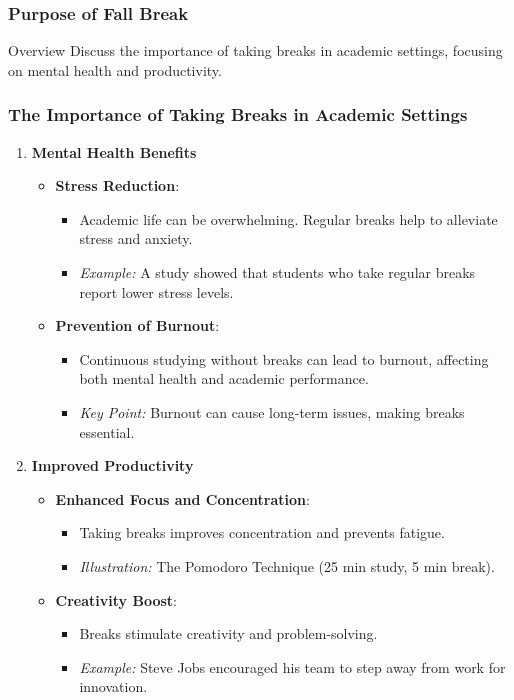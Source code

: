\documentclass[aspectratio=169]{beamer}
\begin{document}
\begin{frame}[fragile]
    \frametitle{Purpose of Fall Break}
    \begin{block}{Overview}
        Discuss the importance of taking breaks in academic settings, focusing on mental health and productivity.
    \end{block}
\end{frame}

\begin{frame}[fragile]
    \frametitle{The Importance of Taking Breaks in Academic Settings}
    \begin{enumerate}
        \item \textbf{Mental Health Benefits}
        \begin{itemize}
            \item \textbf{Stress Reduction}:
            \begin{itemize}
                \item Academic life can be overwhelming. Regular breaks help to alleviate stress and anxiety.
                \item \textit{Example:} A study showed that students who take regular breaks report lower stress levels.
            \end{itemize}
            \item \textbf{Prevention of Burnout}:
            \begin{itemize}
                \item Continuous studying without breaks can lead to burnout, affecting both mental health and academic performance.
                \item \textit{Key Point:} Burnout can cause long-term issues, making breaks essential.
            \end{itemize}
        \end{itemize}
        \item \textbf{Improved Productivity}
        \begin{itemize}
            \item \textbf{Enhanced Focus and Concentration}:
            \begin{itemize}
                \item Taking breaks improves concentration and prevents fatigue.
                \item \textit{Illustration:} The Pomodoro Technique (25 min study, 5 min break).
            \end{itemize}
            \item \textbf{Creativity Boost}:
            \begin{itemize}
                \item Breaks stimulate creativity and problem-solving.
                \item \textit{Example:} Steve Jobs encouraged his team to step away from work for innovation.
            \end{itemize}
        \end{itemize}
    \end{enumerate}
\end{frame}
\end{document}
